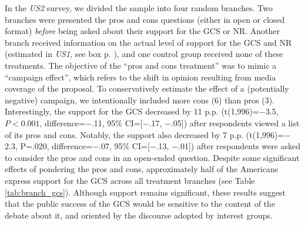 In the \textit{US2} survey, we divided the sample into four random branches. Two branches were presented the pros and cons questions (either in open or closed format) \textit{before} being asked about their support for the GCS or NR. Another branch received information on the actual level of support for the GCS and NR (estimated in \textit{US1}, see box p. \pageref{subsec:second_order_beliefs}), %
and one control group received none of these treatments. %
The objective of the ``pros and cons treatment'' was to mimic a ``campaign effect'', which refers to the shift in opinion resulting from media coverage of the proposal.\citep{gustafson_development_2019,anderson_can_2023} To conservatively estimate the effect of a (potentially negative) campaign, we intentionally included more cons (6) than pros (3). Interestingly, the support for the GCS decreased by 11 p.p. (t(1,996)=$-$3.5, $P<0.001$, difference=$-$.11, 95\% CI=[$-$.17, $-$.05]) after respondents viewed a list of its pros and cons. %
Notably, the support also decreased by 7 p.p. (t(1,996)=$-$2.3, P=.020, difference=$-$.07, 95\% CI=[$-$.13, $-$.01]) after respondents were asked to consider the pros and cons in an open-ended question. Despite some significant effects of pondering the pros and cons, approximately half of the Americans express support for the GCS across all treatment branches (see Table \ref{tab:branch_gcs}). Although support remains significant, %
these results suggest that the public success of the GCS would be sensitive to the content of the debate about it, and oriented by the discourse adopted by interest groups. %


